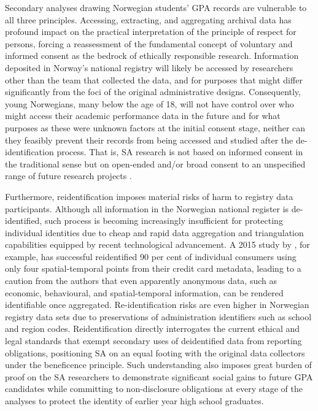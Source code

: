 \documentclass[
        a4paper, %
        12pt, %
        stu, %
        noextraspace, %
        floatsintext, %
        biblatex, %
        twoside, %
        colorlinks=true,        %
        linkcolor=red,          %
        anchorcolor=red,      %
        citecolor=blue,         %
        urlcolor=blue,          %
        bookmarks=true,         %
        bookmarksopen=false,    %
        bookmarksnumbered=true,  %
        dvipsnames
]{apa7}
\begin{document}
Secondary analyses drawing Norwegian students' GPA records are vulnerable to all three principles. Accessing, extracting, and aggregating archival data has profound impact on the practical interpretation of the principle of respect for persons, forcing a reassessment of the fundamental concept of voluntary and informed consent as the bedrock of ethically responsible research. Information deposited in Norway's national registry will likely be accessed by researchers other than the team that collected the data, and for purposes that might differ significantly from the foci of the original administrative designs. Consequently, young Norwegians, many below the age of 18, will not have control over who might access their academic performance data in the future and for what purposes as these were unknown factors at the initial consent stage, neither can they feasibly prevent their records from being accessed and studied after the de-identification process. That is, SA research is not based on informed consent in the traditional sense \parencite{ross:2018} but on open-ended and/or broad consent to an unspecified range of future research projects \parencite{grady:2015}.

Furthermore, reidentification imposes material risks of harm to registry data participants. Although all information in the Norwegian national register is de-identified, such process is becoming increasingly insufficient for protecting individual identities due to cheap and rapid data aggregation and triangulation capabilities equipped by recent technological advancement. A 2015 study by \citeauthor{demontjoye:2015}, for example, has successful reidentified 90 per cent of individual consumers using only four spatial-temporal points from their credit card metadata, leading to a caution from the authors that even apparently anonymous data, such as economic, behavioural, and spatial-temporal information, can be rendered identifiable once aggregated. Re-identification risks are even higher in Norwegian registry data sets due to preservations of administration identifiers such as school and region codes. Reidentification directly interrogates the current ethical and legal standards that exempt secondary uses of deidentified data from reporting obligations, positioning SA on an equal footing with the original data collectors under the beneficence principle. Such understanding also imposes great burden of proof on the SA researchers to demonstrate significant social gains to future GPA candidates while committing to non-disclosure obligations at every stage of the analyses to protect the identity of earlier year high school graduates.
\end{document}
